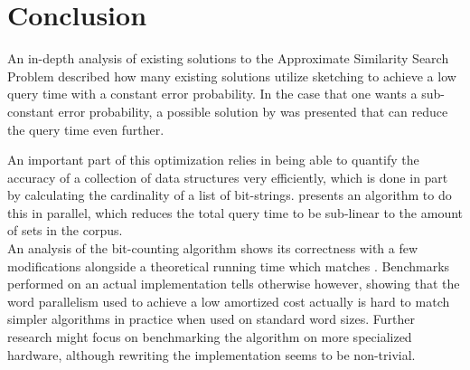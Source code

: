 \section{Conclusion}
An in-depth analysis of existing solutions to the Approximate Similarity Search Problem described how many existing solutions utilize sketching to achieve a low query time with a constant error probability. In the case that one wants a sub-constant error probability, a possible solution by \citet{fast-similarity-search} was presented that can reduce the query time even further.

An important part of this optimization relies in being able to quantify the accuracy of a collection of data structures very efficiently, which is done in part by calculating the cardinality of a list of bit-strings. \citet{fast-similarity-search} presents an algorithm to do this in parallel, which reduces the total query time to be sub-linear to the amount of sets in the corpus.\\
An analysis of the bit-counting algorithm shows its correctness with a few modifications alongside a theoretical running time which matches \cite{fast-similarity-search}. Benchmarks performed on an actual implementation tells otherwise however, showing that the word parallelism used to achieve a low amortized cost actually is hard to match simpler algorithms in practice when used on standard word sizes. Further research might focus on benchmarking the algorithm on more specialized hardware, although rewriting the implementation seems to be non-trivial.
